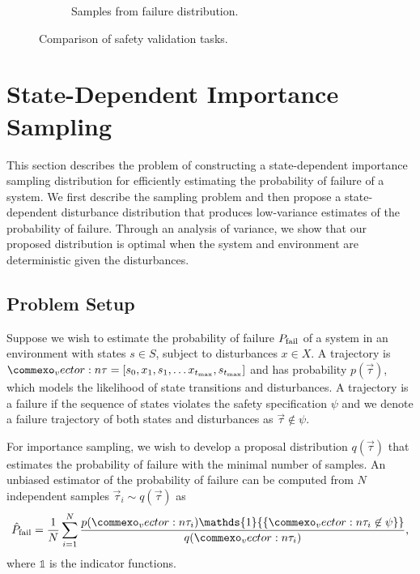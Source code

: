 \begin{figure}
\begin{subfigure}[b]{0.45\textwidth}
        \caption{Samples from failure distribution.}
        \label{fig:dof_dof}
    \end{subfigure}
    \caption{Comparison of safety validation tasks.}
    \label{fig:dof_comparison_safetytasks}
\end{figure}


\section{State-Dependent Importance Sampling}
This section describes the problem of constructing a state-dependent importance sampling distribution for efficiently estimating the probability of failure of a system. We first describe the sampling problem and then  propose a state-dependent disturbance distribution that produces low-variance estimates of the probability of failure. Through an analysis of variance, we show that our proposed distribution is optimal when the system and environment are deterministic given the disturbances.

\subsection{Problem Setup}
Suppose we wish to estimate the probability of failure $P_{\rm fail}$ of a system in an environment with states $s \in S$, subject to disturbances $x \in X$. A trajectory is $\vec{\tau} = [s_0, x_1, s_1, \ldots x_{t_{\rm max}}, s_{t_{\rm max}}]$ and has probability $p(\vec{\tau})$, which models the likelihood of state transitions and disturbances. A trajectory is a failure if the sequence of states violates the safety specification $\psi$ and we denote a failure trajectory of both states and disturbances as $\vec{\tau} \not \in \psi$. 

For importance sampling, we wish to develop a proposal distribution $q(\vec{\tau})$ that estimates the probability of failure with the minimal number of samples. An unbiased estimator of the probability of failure can be computed from $N$ independent samples $\vec{\tau}_i \sim q(\vec{\tau})$ as
\begin{equation}
\hat{P}_{\rm fail} = \frac{1}{N} \sum_{i=1}^N \frac{p(\vec{\tau}_i) \mathds{1}{\{ \vec{\tau}_i \not \in \psi \}}}{q(\vec{\tau}_i)} \text{,} \label{eq:pfail_estimator}
\end{equation}
where $\mathds{1}$ is the indicator functions. 

